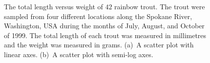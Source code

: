 \documentclass[a4paper,oneside,12pt]{article}
\begin{document}
\begin{figure}[!htbp]
\centering
{}
\caption{%
  The total length versus weight of $42$ rainbow trout.  The trout
  were sampled from four different locations along the Spokane River,
  Washington, USA during the months of July, August, and October of
  1999.  The total length of each trout was measured in millimetres
  and the weight was measured in grams.  (a)~A scatter plot with
  linear axes.  (b)~A scatter plot with semi-log axes.
}
\label{fig:logarithm:rainbow_trout}
\end{figure}
\end{document}
